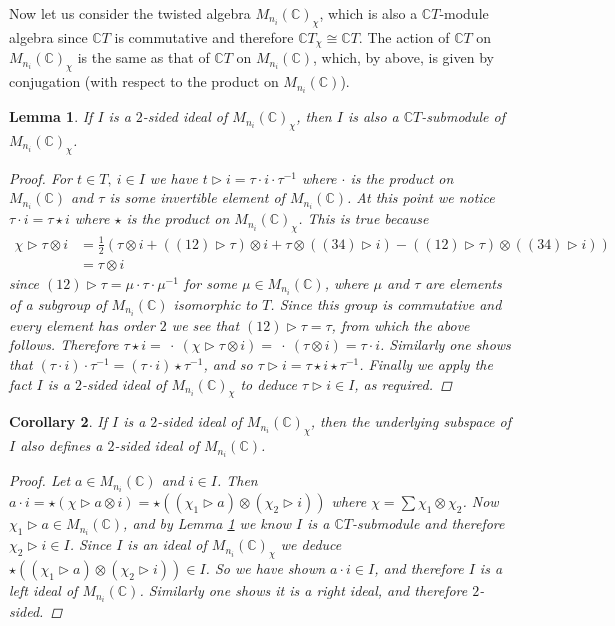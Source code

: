 \documentclass[11pt]{article}
\newcommand{\nt}{\noindent}
\newcommand{\Cc}{\mathbb{C}}
\newtheorem{lemma}{Lemma}[section]
\newtheorem{cor}[lemma]{Corollary}
\theoremstyle{definition}
\begin{document}
\nt Now let us consider the twisted algebra $M_{n_i}(\Cc)_\chi$, which is also a $\Cc T$-module algebra since $\Cc T$ is commutative and therefore $\Cc T_\chi\cong \Cc T$. The action of $\Cc T$ on $M_{n_i}(\Cc)_\chi$ is the same as that of $\Cc T$ on $M_{n_i}(\Cc)$, which, by above, is given by conjugation (with respect to the product on $M_{n_i}(\Cc)$). 
\begin{lemma}\label{submodule_lem} If $I$ is a $2$-sided ideal of $M_{n_i}(\Cc)_\chi$,  then $I$ is also a $\Cc T$-submodule of $M_{n_i}(\Cc)_\chi$.
\begin{proof}
For $t\in T,\ i\in I$ we have $t\rhd i=\tau \cdot i\cdot \tau^{-1}$ where $\cdot$ is the product on $M_{n_i}(\Cc)$ and $\tau$ is some invertible element of $M_{n_i}(\Cc)$.  At this point we notice $\tau \cdot i=\tau \star i$ where $\star$ is the product on $M_{n_i}(\Cc)_\chi$. This is true because 
\begin{align*}
  \chi\rhd \tau \otimes i & =\frac{1}{2}(\tau\otimes i+((12)\rhd \tau)\otimes i+\tau\otimes ((34)\rhd i)-((12)\rhd \tau)\otimes ((34)\rhd i))\\
  & = \tau \otimes i
\end{align*}
since $(12)\rhd \tau=\mu\cdot \tau\cdot \mu^{-1}$ for some $\mu \in M_{n_i}(\Cc)$, where $\mu$ and $\tau$ are elements of a subgroup of $M_{n_i}(\Cc)$ isomorphic to $T$. Since this group is commutative and every element has order $2$ we see that $(12)\rhd \tau=\tau$, from which the above follows. Therefore $\tau\star i=\ \cdot\  (\chi\rhd \tau \otimes i)=\ \cdot\  (\tau\otimes i)=\tau \cdot i$. Similarly one shows that $(\tau \cdot i) \cdot \tau^{-1}=(\tau\cdot i) \star \tau^{-1}$, and so $\tau \rhd i=\tau\star i \star \tau^{-1}$. Finally we apply the fact $I$ is a $2$-sided ideal of $M_{n_i}(\Cc)_\chi$ to deduce $\tau\rhd i\in I$, as required.
\end{proof}
\end{lemma}
\begin{cor}\label{ideal_of_both_algebras} If $I$ is a $2$-sided ideal of $M_{n_i}(\Cc)_\chi$, then the underlying subspace of $I$ also defines a $2$-sided ideal of $M_{n_i}(\Cc)$.
\begin{proof}
Let $a\in M_{n_i}(\Cc)$ and $i\in I$. Then $a\cdot i=\star (\chi\rhd a\otimes i)=\star ((\chi_1\rhd a)\otimes (\chi_2\rhd i))$ where $\chi=\sum \chi_1\otimes \chi_2$. Now $\chi_1\rhd a\in M_{n_i}(\Cc)$, and by Lemma \ref{submodule_lem} we know $I$ is a $\Cc T$-submodule and therefore $\chi_2\rhd i\in I$. Since $I$ is an ideal of $M_{n_i}(\Cc)_\chi$ we deduce $\star ((\chi_1\rhd a)\otimes (\chi_2\rhd i))\in I$. So we have shown $a\cdot i\in I$, and therefore $I$ is a left ideal of $M_{n_i}(\Cc)$. Similarly one shows it is a right ideal, and therefore $2$-sided.
\end{proof}
\end{cor}
\end{document}
